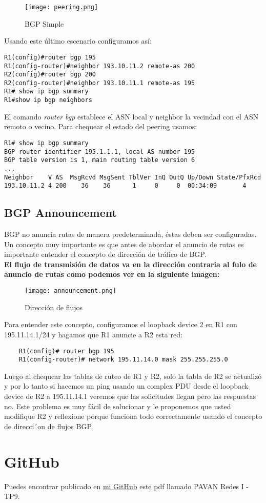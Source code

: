 \documentclass{article}
\begin{document}
\begin{figure}[H]
    \centering
    \texttt{[image: peering.png]}
    \caption{BGP Simple}
    \label{fig:enter-label}
\end{figure}
Usando este último escenario configuramos así:
\begin{lstlisting}
R1(config)#router bgp 195
R1(config-router)#neighbor 193.10.11.2 remote-as 200
R2(config)#router bgp 200
R2(config-router)#neighbor 193.10.11.1 remote-as 195
R1# show ip bgp summary
R1#show ip bgp neighbors 
\end{lstlisting} 
El comando \textit{router bgp} establece el ASN local y neighbor la vecindad con el ASN remoto o vecino.
Para chequear el estado del peering usamos:
\begin{lstlisting}
R1# show ip bgp summary
BGP router identifier 195.1.1.1, local AS number 195
BGP table version is 1, main routing table version 6
...
Neighbor    V AS  MsgRcvd MsgSent TblVer InQ OutQ Up/Down State/PfxRcd
193.10.11.2 4 200    36    36      1     0     0  00:34:09       4
\end{lstlisting}

\subsection{BGP Announcement}
BGP no anuncia rutas de manera predeterminada, éstas deben ser configuradas. 
Un concepto muy importante es que antes de abordar el anuncio de rutas es importante entender el concepto de dirección de tráfico de BGP.
\\
\textbf{El flujo de transmisión de datos va en la dirección contraria al fulo de anuncio de rutas como podemos ver en la siguiente imagen:}
\begin{figure}[H]
    \centering
    \texttt{[image: announcement.png]}
    \caption{Dirección de flujos}
    \label{fig:enter-label}
\end{figure}
Para entender este concepto, configuramos el loopback device 2 en R1 con 195.11.14.1/24 y
hagamos que R1 anuncie a R2 esta red:
\begin{lstlisting}
    R1(config)# router bgp 195
    R1(config-router)# network 195.11.14.0 mask 255.255.255.0
\end{lstlisting}
Luego al chequear las tablas de ruteo de R1 y R2, solo la tabla de R2 se actualizó y por lo
tanto si hacemos un ping usando un complex PDU desde el loopback device de R2 a 195.11.14.1
veremos que las solicitudes llegan pero las respuestas no. Este problema es muy fácil de solucionar
y le proponemos que usted modifique R2 y reflexione porque funciona todo correctamente usando
el concepto de direcci´on de flujos BGP.

\section{GitHub}
Puedes encontrar publicado en \href{https://github.com/martinpavan1/redes1}{mi GitHub} este pdf llamado PAVAN Redes I - TP9.
\end{document}
